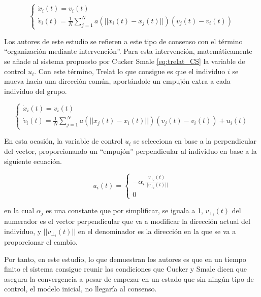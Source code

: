 \begin{equation}\label{eq:trelat_CS}
    \left\lbrace
    \begin{array}{ll}
        \dot{x}_{i}(t)=v_{i}(t) \\
        \dot{v}_{i}(t)= \displaystyle{\frac{1}{N}\sum_{j=1}^{N} a(||x_i(t)-x_j(t)||)(v_{j}(t)-v_{i}(t))}
    \end{array}
    \right.
\end{equation}

Los autores de este estudio se refieren a este tipo de consenso con el término ``organización mediante intervención''. Para esta intervención, matemáticamente se añade al sistema propuesto por Cucker Smale \ref{eq:trelat_CS} la variable de control $u_i$. Con este término, Trelat lo que consigue es que el individuo $i$ se mueva hacia una dirección común, aportándole un empujón extra a cada individuo del grupo. 

\begin{equation}\label{eq:CSTrelat_control}
    \left\lbrace
    \begin{array}{l}
        \dot{x}_{i}(t)=v_{i}(t) \\
        \dot{v}_{i}(t)= \displaystyle{\frac{1}{N}\sum_{j=1}^{N}a(||x_{j}(t)-x_{i}(t)||)(v_{j}(t)-v_{i}(t))+u_{i}(t)}
    \end{array}
    \right.
\end{equation}

En esta ocasión, la variable de control $u_i$ se selecciona en base a la perpendicular del vector, proporcionando un ``empujón'' perpendicular al individuo en base a la siguiente ecuación. 

\begin{equation}\label{eq:Trelat_ui}
    u_i(t) = 
    \left\lbrace
    \begin{array}{l}
        \displaystyle{-\alpha_i \frac{v_{\perp_{i}}(t)}{||v_{\perp_{i}}(t)||}} \\
        0
    \end{array}
    \right.
\end{equation}

\noindent en la cual $\alpha_j$ es una constante que por simplificar, se iguala a 1, $v_{\perp_{i}}(t)$ del numerador es el vector perpendicular que va a modificar la dirección actual del individuo, y $||v_{\perp_{i}}(t)||$ en el denominador es la dirección en la que se va a proporcionar el cambio. 

Por tanto, en este estudio, lo que demuestran los autores es que en un tiempo finito el sistema consigue reunir las condiciones que Cucker y Smale dicen que asegura la convergencia a pesar de empezar en un estado que sin ningún tipo de control, el modelo inicial, no llegaría al consenso.
